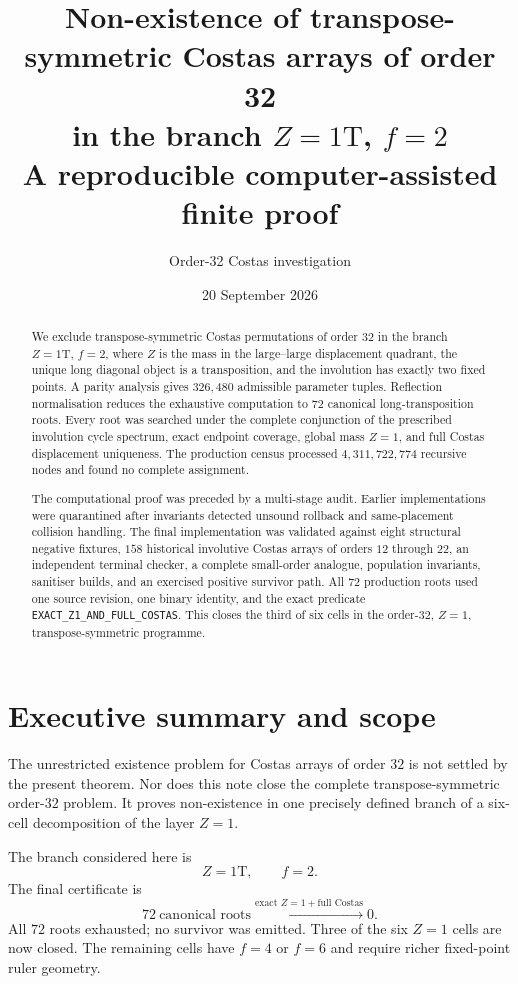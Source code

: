 \documentclass[11pt,a4paper]{article}
\title{\textbf{Non-existence of transpose-symmetric Costas arrays of order 32\\in the branch $Z=1\mathrm T$, $f=2$}\\[1ex]\large A reproducible computer-assisted finite proof}
\author{Order-32 Costas investigation}
\date{20 September 2026}
\theoremstyle{definition}\newtheorem{definition}[theorem]{Definition}
\theoremstyle{remark}\newtheorem{remark}[theorem]{Remark}
\newcommand{\code}[1]{\texttt{#1}}
\begin{document}
\maketitle
\begin{abstract}
We exclude transpose-symmetric Costas permutations of order $32$ in the branch $Z=1\mathrm T$, $f=2$, where $Z$ is the mass in the large--large displacement quadrant, the unique long diagonal object is a transposition, and the involution has exactly two fixed points. A parity analysis gives $326{,}480$ admissible parameter tuples. Reflection normalisation reduces the exhaustive computation to $72$ canonical long-transposition roots. Every root was searched under the complete conjunction of the prescribed involution cycle spectrum, exact endpoint coverage, global mass $Z=1$, and full Costas displacement uniqueness. The production census processed $4{,}311{,}722{,}774$ recursive nodes and found no complete assignment.

The computational proof was preceded by a multi-stage audit. Earlier implementations were quarantined after invariants detected unsound rollback and same-placement collision handling. The final implementation was validated against eight structural negative fixtures, $158$ historical involutive Costas arrays of orders $12$ through $22$, an independent terminal checker, a complete small-order analogue, population invariants, sanitiser builds, and an exercised positive survivor path. All $72$ production roots used one source revision, one binary identity, and the exact predicate \code{EXACT\_Z1\_AND\_FULL\_COSTAS}. This closes the third of six cells in the order-$32$, $Z=1$, transpose-symmetric programme.
\end{abstract}
\tableofcontents
\newpage

\section{Executive summary and scope}
The unrestricted existence problem for Costas arrays of order $32$ is not settled by the present theorem. Nor does this note close the complete transpose-symmetric order-$32$ problem. It proves non-existence in one precisely defined branch of a six-cell decomposition of the layer $Z=1$.

The branch considered here is
\[
\boxed{Z=1\mathrm T,\qquad f=2.}
\]
The final certificate is
\[
\boxed{72\ \text{canonical roots}\xrightarrow{\text{exact }Z=1+\text{full Costas}}0.}
\]
All $72$ roots exhausted; no survivor was emitted. Three of the six $Z=1$ cells are now closed. The remaining cells have $f=4$ or $f=6$ and require richer fixed-point ruler geometry.
\end{document}
